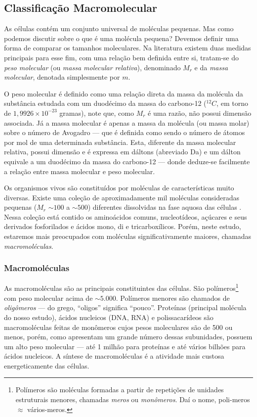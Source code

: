 \documentclass[a4paper,12pt]{article}
\begin{document}
	\subsection{Classificação Macromolecular}
	As células contém um conjunto universal de moléculas pequenas. Mas como podemos discutir sobre o que é uma molécula pequena? Devemos definir uma forma de comparar os tamanhos moleculares. Na literatura existem duas medidas principais para esse fim, com uma relação bem definida entre si, tratam-se do \textit{peso molecular} (ou \textit{massa molecular relativa}), denominado $M_r$ e da \textit{massa molecular}, denotada simplesmente por $m$.
	
	O peso molecular é definido como uma relação direta da massa da molécula da substância estudada com um duodécimo da massa do carbono-12 ($^{12}C$, em torno de $1,9926\times 10^{-23}$ gramas), note que, como $M_r$ é uma razão, não possui dimensão associada. Já a massa molecular é apenas a massa da molécula (ou massa molar) sobre o número de Avogadro --- que é definida como sendo o número de átomos por mol de uma determinada substância. Esta, diferente da massa molecular relativa, possui dimensão e é expressa em dáltons (abreviado Da) e um dálton equivale a um duodécimo da massa do carbono-12 --- donde deduze-se facilmente a relação entre massa molecular e peso molecular.
	
	Os organismos vivos são constituídos por moléculas de características muito diversas. Existe uma coleção de aproximadamente mil moléculas consideradas pequenas ($M_r$ ${\sim}100$ a ${\sim}500$) diferentes dissolvidas na fase aquosa das células \cite{bioquimicaLehninger}. Nessa coleção está contido os aminoácidos comuns, nucleotídeos, açúcares e seus derivados fosforilados e ácidos mono, di e tricarboxílicos. Porém, neste estudo, estaremos mais preocupados com moléculas significativamente maiores, chamadas \textit{macromoléculas}.
	\subsubsection*{Macromoléculas}
	As macromoléculas são as principais constituintes das células. São polímeros\footnote[1]{Polímeros são moléculas formadas a partir de repetições de unidades estruturais menores, chamadas \textit{meros} ou \textit{monômeros}. Daí o nome, poli-meros $\approx$ vários-meros.} com peso molecular acima de ${\sim}5.000$. Polímeros menores são chamados de \textit{oligômeros} --- do grego, ``oligos'' significa ``pouco''. Proteínas (principal molécula do nosso estudo), ácidos nucleicos (DNA, RNA) e polissacarídeos são macromoléculas feitas de monômeros cujos pesos moleculares são de 500 ou menos, porém, como apresentam um grande número dessas subunidades, possuem um alto peso molecular --- até 1 milhão para proteínas e até vários bilhões para ácidos nucleicos. A síntese de macromoléculas é a atividade mais custosa energeticamente das células.
	
\end{document}
